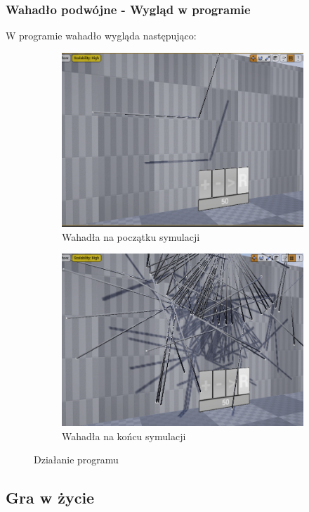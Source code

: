 \documentclass[a4paper,12pt,reqno]{article}
\begin{document}
\subsubsection{Wahadło podwójne - Wygląd w programie}
W programie wahadło wygląda następująco:


\begin{figure}[H]%
	\centering
	\begin{subfigure}{.5\textwidth}
		\centering
		\includegraphics[width=0.8\linewidth]{graphics/pendulum/PendulumInUE_1.png}
		\caption{Wahadła na początku symulacji}	
		\label{ref:subref_a}
	\end{subfigure}%
	\begin{subfigure}{.5\textwidth}
		\centering
		\includegraphics[width=0.8\linewidth]{graphics/pendulum/PendulumInUE_2.png}
		\caption{Wahadła na końcu symulacji}
		\label{ref:subref_b}
	\end{subfigure}%
	

\caption{Działanie programu}
\label{ref:ref}
\end{figure}

\newpage
\subsection{Gra w życie}
\end{document}
